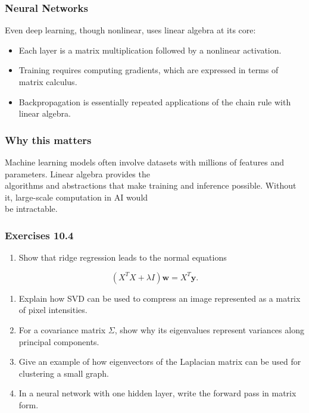 \documentclass[
  12pt,
  a4paper,
]{article}
\begin{document}
\subsubsection{Neural Networks}\label{neural-networks}

Even deep learning, though nonlinear, uses linear algebra at its core:

\begin{itemize}
\item
  Each layer is a matrix multiplication followed by a nonlinear
  activation.
\item
  Training requires computing gradients, which are expressed in terms of
  matrix calculus.
\item
  Backpropagation is essentially repeated applications of the chain rule
  with linear algebra.
\end{itemize}

\subsubsection{Why this matters}\label{why-this-matters-39}

Machine learning models often involve datasets with millions of features
and parameters. Linear algebra provides the\\
algorithms and abstractions that make training and inference possible.
Without it, large-scale computation in AI would\\
be intractable.

\subsubsection{Exercises 10.4}\label{exercises-104}

\begin{enumerate}
\def\labelenumi{\arabic{enumi}.}
\item
  Show that ridge regression leads to the normal equations
\end{enumerate}

\[(X^T X + \lambda I)\mathbf{w} = X^T \mathbf{y}.\]

\begin{enumerate}
\def\labelenumi{\arabic{enumi}.}
\item
  Explain how SVD can be used to compress an image represented as a
  matrix of pixel intensities.
\item
  For a covariance matrix \(\Sigma\), show why its eigenvalues represent
  variances along principal components.
\item
  Give an example of how eigenvectors of the Laplacian matrix can be
  used for clustering a small graph.
\item
  In a neural network with one hidden layer, write the forward pass in
  matrix form.
\end{enumerate}
\end{document}
